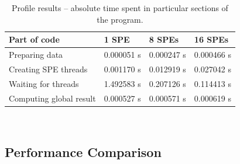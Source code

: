 \begin{table}[htb]
\begin{footnotesize}
\caption{Profile results -- absolute time spent in particular sections of the program.}
\label{tab:t4}
\newcommand{\m}{\hphantom{$-$}}
\newcommand{\cc}[1]{\multicolumn{1}{c}{#1}}
\renewcommand{\tabcolsep}{0.5pc} %
\renewcommand{\arraystretch}{1.2} %
\begin{tabular}{@{}llll}
\hline
\textbf{Part of code} & \textbf{1 SPE} & \textbf{8 SPEs} & \textbf{16 SPEs} \\
\hline
Preparing data & 0.000051 s & 0.000247 s & 0.000466 s \\
Creating  SPE threads & 0.001170 s & 0.012919 s & 0.027042 s \\
Waiting for threads & 1.492583 s & 0.207126 s & 0.114413 s \\
Computing global result & 0.000527 s & 0.000571 s & 0.000619 s \\
\hline
\end{tabular}\\[2pt]
\end{footnotesize}
\end{table}

\subsection{Performance Comparison}


